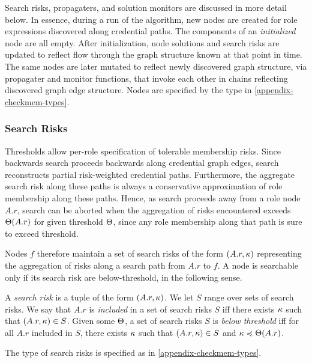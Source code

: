 Search risks, propagaters, and solution monitors are discussed in more
detail below.  In essence, during a run of the algorithm, new nodes
are created for role expressions discovered along credential paths.
The components of an \emph{initialized} node are all empty.  After
initialization, node solutions and search risks are updated to reflect
flow through the graph structure known at that point in time.  The
same nodes are later mutated to reflect newly discovered graph
structure, via propagater and monitor functions, that invoke each
other in chains reflecting discovered graph edge structure. Nodes are
specified by the type  in \autoref{appendix-checkmem-types}.

\subsubsection{Search Risks}

Thresholds allow per-role specification of tolerable membership risks.
Since backwards search proceeds backwards along credential graph
edges, search reconstructs partial risk-weighted credential paths.
Furthermore, the aggregate search risk along these paths is always a
conservative approximation of role membership along these paths.
Hence, as search proceeds away from a role node $A.r$, search can be
aborted when the aggregation of risks encountered exceeds
$\Theta(A.r)$ for given threshold $\Theta$, since any role membership along
that path is sure to exceed threshold.

Nodes $f$ therefore maintain a set of search risks of the form 
$(A.r, \kappa)$ representing the aggregation of risks along
a search path from $A.r$ to $f$.  A node is searchable only 
if its search risk are below-threshold, in the following sense.
\begin{definition}
\label{def-below-thresh}
A \emph{search risk} is a tuple of the form $(A.r,\kappa)$.  We let $S$
range over sets of search risks.  We say that $A.r$ is \emph{included}
in a set of search risks $S$ iff there exists $\kappa$ such that $(A.r,
\kappa) \in S$.  Given some $\Theta$, a set of search risks $S$ is
\emph{below threshold} iff for all $A.r$ included in $S$, there exists
$\kappa$ such that $(A.r, \kappa) \in S$ and $\kappa \preccurlyeq \Theta(A.r)$.
\end{definition}
The type of search risks is specified as  in
\autoref{appendix-checkmem-types}.


